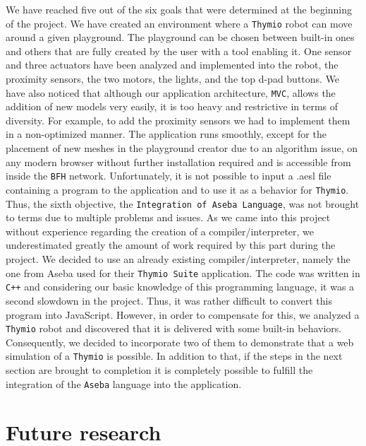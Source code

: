 \documentclass{scrreprt}
\begin{document}
We have reached five out of the six goals that were determined at the beginning of the project. We have created an environment where a \texttt{Thymio} robot can move around a given playground. The playground can be chosen between built-in ones and others that are fully created by the user with a tool enabling it.
One sensor and three actuators have been analyzed and implemented into the robot, the proximity sensors, the two motors, the lights, and the top d-pad buttons. We have also noticed that although our application architecture, \texttt{MVC}, allows the addition of new models very easily, it is too heavy and restrictive in terms of diversity. 
For example, to add the proximity sensors we had to implement them in a non-optimized manner. The application runs smoothly, except for the placement of new meshes in the playground creator due to an algorithm issue, 
on any modern browser without further installation required and is accessible from inside the \texttt{BFH} network. Unfortunately, it is not possible to input a .aesl file containing a program to the application and to use it as a behavior for \texttt{Thymio}. 
Thus, the sixth objective, the \texttt{Integration of Aseba Language}, was not brought to terms due to multiple problems and issues. As we came into this project without experience regarding the creation of a compiler/interpreter, we underestimated greatly the amount of work required by this part during the project. 
We decided to use an already existing compiler/interpreter, namely the one from Aseba used for their \texttt{Thymio Suite} application. The code was written in \texttt{C++} and considering our basic knowledge of this programming language, it was a second slowdown in the project.
Thus, it was rather difficult to convert this program into JavaScript. However, in order to compensate for this, we analyzed a \texttt{Thymio} robot and discovered that it is delivered with some built-in behaviors. Consequently, we decided to incorporate two of them to demonstrate that a web simulation of a \texttt{Thymio} is possible. 
In addition to that, if the steps in the next section are brought to completion it is completely possible to fulfill the integration of the \texttt{Aseba} language into the application.

\section{Future research \label{future}}
\end{document}
